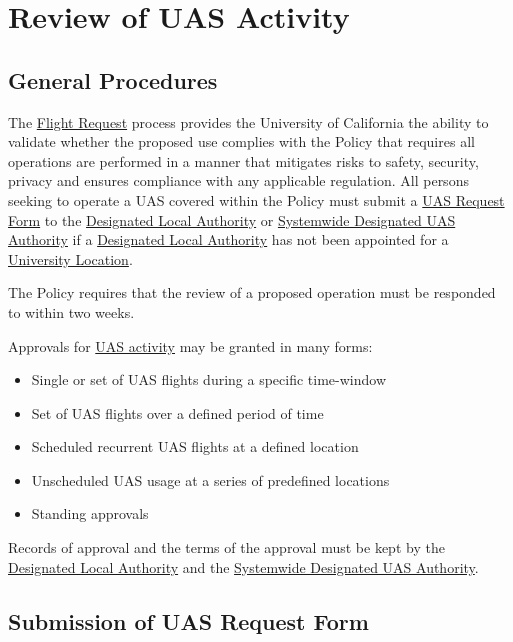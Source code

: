 \documentclass[
]{book}
\providecommand{\tightlist}{%
  \setlength{\itemsep}{0pt}\setlength{\parskip}{0pt}}
\begin{document}
\hypertarget{ch-review}{%
\chapter{Review of UAS Activity}\label{ch-review}}

\hypertarget{s-general}{%
\section{General Procedures}\label{s-general}}

The \protect\hyperlink{FR}{Flight Request} process provides the University of California the ability to validate whether the proposed use complies with the Policy that requires all operations are performed in a manner that mitigates risks to safety, security, privacy and ensures compliance with any applicable regulation. All persons seeking to operate a UAS covered within the Policy must submit a \protect\hyperlink{FR}{UAS Request Form} to the \protect\hyperlink{DLA}{Designated Local Authority} or \protect\hyperlink{SDA}{Systemwide Designated UAS Authority} if a \protect\hyperlink{DLA}{Designated Local Authority} has not been appointed for a \protect\hyperlink{UL}{University Location}.

The Policy requires that the review of a proposed operation must be responded to within two weeks.

Approvals for \protect\hyperlink{UASactivity}{UAS activity} may be granted in many forms:

\begin{itemize}
\tightlist
\item
  Single or set of UAS flights during a specific time-window
\item
  Set of UAS flights over a defined period of time
\item
  Scheduled recurrent UAS flights at a defined location
\item
  Unscheduled UAS usage at a series of predefined locations
\item
  Standing approvals
\end{itemize}

Records of approval and the terms of the approval must be kept by the \protect\hyperlink{DLA}{Designated Local Authority} and the \protect\hyperlink{SDA}{Systemwide Designated UAS Authority}.

\hypertarget{s-form}{%
\section{Submission of UAS Request Form}\label{s-form}}
\end{document}

